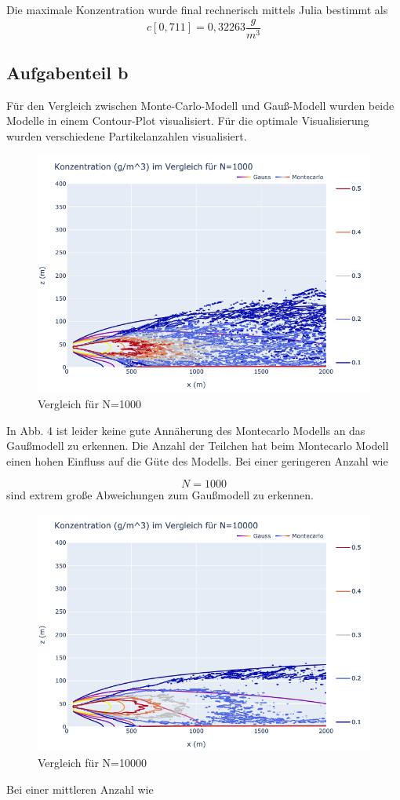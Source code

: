 \documentclass[ngerman]{scrartcl}
\begin{document}
Die maximale Konzentration wurde final rechnerisch mittels Julia bestimmt als
\begin{equation}
	c[0,711] = 0,32263  \frac{g}{m^3}
\end{equation}
\subsection{Aufgabenteil b}
Für den Vergleich zwischen Monte-Carlo-Modell und Gauß-Modell wurden beide Modelle in einem Contour-Plot visualisiert.  Für die optimale Visualisierung wurden verschiedene Partikelanzahlen visualisiert.
\begin{figure}[H]
	\centering
	\includegraphics[scale=0.5]{Bilder/1b1k.png}
	\caption{Vergleich für N=1000}
	\label{fig:my_label}
\end{figure}
In Abb. 4 ist leider keine gute Annäherung des Montecarlo Modells an das Gaußmodell zu erkennen. Die Anzahl der Teilchen hat beim Montecarlo Modell einen hohen Einfluss auf die Güte des Modells. Bei einer geringeren Anzahl wie 

\begin{equation}
	N=1000
\end{equation}
sind extrem große Abweichungen zum Gaußmodell zu erkennen.
\begin{figure}[H]
	\centering
	\includegraphics[scale=0.5]{Bilder/1b10k.png}
	\caption{Vergleich für N=10000}
	\label{fig:my_label}
\end{figure}
Bei einer mittleren Anzahl wie 
\end{document}
